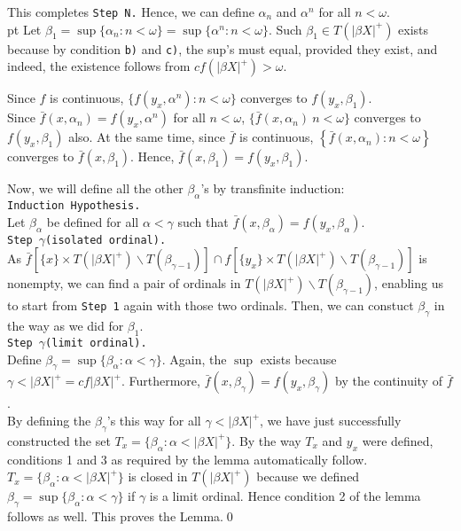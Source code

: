 \documentclass{article}
\begin{document}
This completes \texttt{Step N.} Hence, we can define $\alpha_n$ and $\alpha^n$ for all $n<\omega$.\\
 pt
 Let $\beta_1=\sup\{\alpha_n:n<\omega\}=\sup\{\alpha^n: n<\omega \}.$ Such $\beta_1\in T(|\beta X|^+)$ exists because by condition \texttt{b)} and \texttt{c)}, the sup's must equal, provided they exist, and indeed, the existence follows from $cf(|\beta X|^+) > \omega$. 
 
\vskip 15pt 
 
Since $f$ is continuous, $\{f(y_x,\alpha^n): n<\omega\}$ converges to $f(y_x,\beta_1)$.\\
Since $\bar{f}(x,\alpha_n)=f(y_x,\alpha^n)$ for all $n<\omega$, $\{\bar{f}(x,\alpha_n)\: n<\omega\}$ converges to $f(y_x,\beta_1)$ also. At the same time, since $\bar{f}$ is continuous, $\left\{\bar{f}(x,\alpha_n): n<\omega\right\}$ converges to $\bar{f}(x,\beta_1).$ Hence, $\bar{f}(x, \beta_1)=f(y_x,\beta_1).$

\vskip 20pt

Now, we will define all the other $\beta_\alpha$'s by transfinite induction: \\

\texttt{Induction Hypothesis.}\\
Let $\beta_\alpha$ be defined for all $\alpha<\gamma$ such that $\bar{f}(x,\beta_\alpha)=f(y_x,\beta_\alpha)$.\\

\texttt{Step $\gamma$(isolated ordinal).}\\
As $\bar{f}[\{x\}\times T(|\beta X|^+)\backslash T(\beta_{\gamma-1})] \cap f[\{y_x\} \times T(|\beta X |^+)\backslash T(\beta_{\gamma-1})]$ is nonempty, we can find a pair of ordinals in  $T(|\beta X|^+)\backslash T(\beta_{\gamma-1})$, enabling us to start from \texttt{Step 1} again with those two ordinals. Then, we can constuct $\beta_\gamma$ in the way as we did for $\beta_1$.\\


\texttt{Step $\gamma$(limit ordinal).}\\
Define $\beta_\gamma = \sup\{\beta_\alpha: \alpha<\gamma\}.$ Again, the $\sup$ exists because $\gamma < |\beta X|^+= cf|\beta X|^+.$ Furthermore, $\bar{f}(x,\beta_\gamma)=f(y_x,\beta_\gamma)$ by the continuity of $\bar{f}$.\\


By defining the $\beta_\gamma$'s this way for all $\gamma <|\beta X|^+$, we have just successfully constructed the set $T_x=\{\beta_\alpha: \alpha < |\beta X|^+\}$. By the way $T_x$ and $y_x$ were defined, conditions 1 and 3 as required by the lemma automatically follow.  $T_x=\{\beta_\alpha: \alpha < |\beta X|^+\}$ is
 closed in $T(|\beta X|^+)$ because we defined $\beta_\gamma = \sup\{\beta_\alpha: \alpha<\gamma\}$ if $\gamma$ is a limit ordinal. Hence condition 2 of the lemma follows as well. This proves the Lemma.\qed
\end{document}
